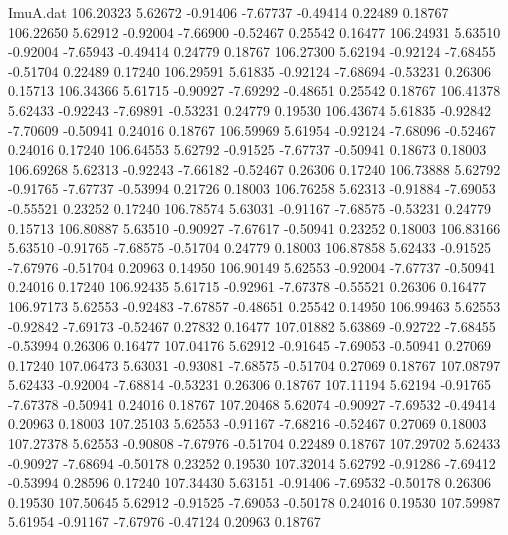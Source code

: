\begin{filecontents}{ImuA.dat}
 106.20323    5.62672   -0.91406   -7.67737   -0.49414    0.22489    0.18767
 106.22650    5.62912   -0.92004   -7.66900   -0.52467    0.25542    0.16477
 106.24931    5.63510   -0.92004   -7.65943   -0.49414    0.24779    0.18767
 106.27300    5.62194   -0.92124   -7.68455   -0.51704    0.22489    0.17240
 106.29591    5.61835   -0.92124   -7.68694   -0.53231    0.26306    0.15713
 106.34366    5.61715   -0.90927   -7.69292   -0.48651    0.25542    0.18767
 106.41378    5.62433   -0.92243   -7.69891   -0.53231    0.24779    0.19530
 106.43674    5.61835   -0.92842   -7.70609   -0.50941    0.24016    0.18767
 106.59969    5.61954   -0.92124   -7.68096   -0.52467    0.24016    0.17240
 106.64553    5.62792   -0.91525   -7.67737   -0.50941    0.18673    0.18003
 106.69268    5.62313   -0.92243   -7.66182   -0.52467    0.26306    0.17240
 106.73888    5.62792   -0.91765   -7.67737   -0.53994    0.21726    0.18003
 106.76258    5.62313   -0.91884   -7.69053   -0.55521    0.23252    0.17240
 106.78574    5.63031   -0.91167   -7.68575   -0.53231    0.24779    0.15713
 106.80887    5.63510   -0.90927   -7.67617   -0.50941    0.23252    0.18003
 106.83166    5.63510   -0.91765   -7.68575   -0.51704    0.24779    0.18003
 106.87858    5.62433   -0.91525   -7.67976   -0.51704    0.20963    0.14950
 106.90149    5.62553   -0.92004   -7.67737   -0.50941    0.24016    0.17240
 106.92435    5.61715   -0.92961   -7.67378   -0.55521    0.26306    0.16477
 106.97173    5.62553   -0.92483   -7.67857   -0.48651    0.25542    0.14950
 106.99463    5.62553   -0.92842   -7.69173   -0.52467    0.27832    0.16477
 107.01882    5.63869   -0.92722   -7.68455   -0.53994    0.26306    0.16477
 107.04176    5.62912   -0.91645   -7.69053   -0.50941    0.27069    0.17240
 107.06473    5.63031   -0.93081   -7.68575   -0.51704    0.27069    0.18767
 107.08797    5.62433   -0.92004   -7.68814   -0.53231    0.26306    0.18767
 107.11194    5.62194   -0.91765   -7.67378   -0.50941    0.24016    0.18767
 107.20468    5.62074   -0.90927   -7.69532   -0.49414    0.20963    0.18003
 107.25103    5.62553   -0.91167   -7.68216   -0.52467    0.27069    0.18003
 107.27378    5.62553   -0.90808   -7.67976   -0.51704    0.22489    0.18767
 107.29702    5.62433   -0.90927   -7.68694   -0.50178    0.23252    0.19530
 107.32014    5.62792   -0.91286   -7.69412   -0.53994    0.28596    0.17240
 107.34430    5.63151   -0.91406   -7.69532   -0.50178    0.26306    0.19530
 107.50645    5.62912   -0.91525   -7.69053   -0.50178    0.24016    0.19530
 107.59987    5.61954   -0.91167   -7.67976   -0.47124    0.20963    0.18767

\end{filecontents}
